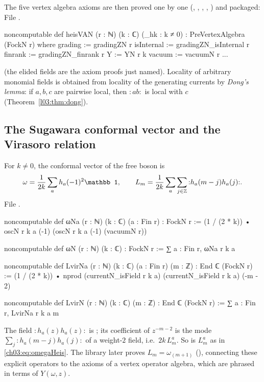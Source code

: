 The five vertex algebra axioms are then proved one by one (, ,
, , ) and packaged:
\noindent File .
\begin{leancode}
noncomputable def heisVAN (r : ℕ) (k : ℂ) (_hk : k ≠ 0) : PreVertexAlgebra (FockN r) where
  grading := gradingZN r
  isInternal := gradingZN_isInternal r
  finrank := gradingZN_finrank r
  Y := YN r k
  vacuum := vacuumN r
  ...
\end{leancode}
(the elided fields are the axiom proofs just named). Locality of arbitrary monomial fields is
obtained from locality of the generating currents by \emph{Dong's lemma}: if $a,b,c$ are pairwise
local, then ${:}ab{:}$ is local with $c$ (Theorem~\ref{l03:thm:dong}).

\subsection{The Sugawara conformal vector and the Virasoro relation}

For $k\neq0$, the conformal vector of the free boson is
\begin{equation}\label{ch03:eq:omegaHeis}
  \omega=\frac{1}{2k}\sum_{a}h_a(-1)^2\mathbb 1,\qquad
  L_m=\frac1{2k}\sum_a\sum_{j\in\Z}{:}h_a(m-j)h_a(j){:} .
\end{equation}
\noindent File .
\begin{leancode}
noncomputable def ωNa (r : ℕ) (k : ℂ) (a : Fin r) : FockN r :=
  (1 / (2 * k)) • oscN r k a (-1) (oscN r k a (-1) (vacuumN r))

noncomputable def ωN (r : ℕ) (k : ℂ) : FockN r := ∑ a : Fin r, ωNa r k a

noncomputable def LvirNa (r : ℕ) (k : ℂ) (a : Fin r) (m : ℤ) : End ℂ (FockN r) :=
  (1 / (2 * k)) • nprod (currentN_isField r k a) (currentN_isField r k a) (-m - 2)

noncomputable def LvirN (r : ℕ) (k : ℂ) (m : ℤ) : End ℂ (FockN r) :=
  ∑ a : Fin r, LvirNa r k a m
\end{leancode}

\begin{dictionary}
The field ${:}h_a(z)h_a(z){:}$ is ; its coefficient of $z^{-m-2}$ is the
mode $\sum_j{:}h_a(m-j)h_a(j){:}$ of a weight-$2$ field, i.e.\ $2k\,L^a_m$. So 
is $L^a_m$ as in \eqref{ch03:eq:omegaHeis}. The library later proves
$L_m=\omega_{(m+1)}$ (), connecting these explicit operators to the
axioms of a vertex operator algebra, which are phrased in terms of $Y(\omega,z)$.
\end{dictionary}

